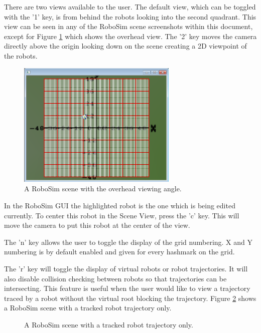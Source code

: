 \documentclass{article}
\begin{document}
There are two views available to the user.  The default view, which can be
toggled with the '1' key, is from behind the robots looking into the second
quadrant.  This view can be seen in any of the RoboSim scene screenshots within
this document, except for Figure \ref{fig:robosim_overhead} which shows the
overhead view.  The '2' key moves the camera directly above the origin looking
down on the scene creating a 2D viewpoint of the robots.
\begin{figure}[H]
	\begin{center}
		\includegraphics[width=3in]{pictures/robosim_overhead}
	\end{center}
	\caption{A RoboSim scene with the overhead viewing angle.}
	\label{fig:robosim_overhead}
\end{figure}

In the RoboSim GUI the highlighted robot is the one which is being edited
currently.  To center this robot in the Scene View, press the 'c' key.  This
will move the camera to put this robot at the center of the view.

The 'n' key allows the user to toggle the display of the grid numbering.  X and
Y numbering is by default enabled and given for every hashmark on the grid.

The 'r' key will toggle the display of virtual robots or robot trajectories.  It
will also disable collision checking between robots so that trajectories can be
intersecting.  This feature is useful when the user would like to view a
trajectory traced by a robot without the virtual root blocking the trajectory.
Figure \ref{fig:robosim_norobot} shows a RoboSim scene with a tracked robot
trajectory only.
\begin{figure}[H]
	\begin{center}
	\end{center}
	\caption{A RoboSim scene with a tracked robot trajectory only.}
	\label{fig:robosim_norobot}
\end{figure}
\end{document}
